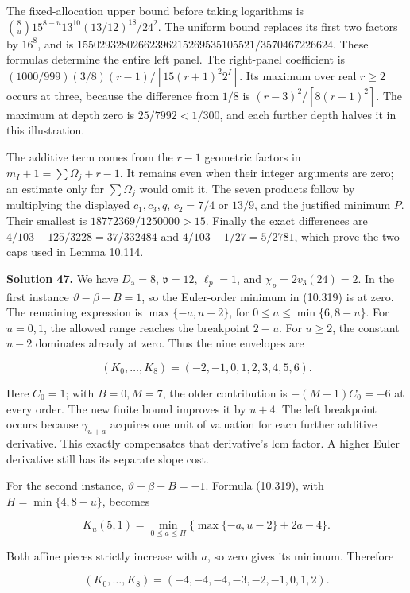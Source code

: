 \documentclass[
  11pt,
  a4paper,
]{article}
\begin{document}
The fixed-allocation upper bound before taking logarithms is
\(\binom8u15^{8-u}13^{10}(13/12)^{18}/24^2\). The uniform bound replaces
its first two factors by \(16^8\), and is
\(15502932802662396215269535105521/3570467226624\). These formulas
determine the entire left panel. The right-panel coefficient is
\((1000/999)(3/8)(r-1)/[15(r+1)^2 2^I]\). Its maximum over real
\(r\ge2\) occurs at three, because the difference from \(1/8\) is
\((r-3)^2/[8(r+1)^2]\). The maximum at depth zero is \(25/7992<1/300\),
and each further depth halves it in this illustration.

The additive term comes from the \(r-1\) geometric factors in
\(m_I+1=\sum\Omega_j+r-1\). It remains even when their integer arguments
are zero; an estimate only for \(\sum\Omega_j\) would omit it. The seven
products follow by multiplying the displayed \(c_1,c_3,q\), \(c_2=7/4\)
or \(13/9\), and the justified minimum \(P\). Their smallest is
\(18772369/1250000>15\). Finally the exact differences are
\(4/103-125/3228=37/332484\) and \(4/103-1/27=5/2781\), which prove the
two caps used in Lemma 10.114.

\textbf{Solution 47.} We have \(D_{\mathrm a}=8\), \(\mathfrak v=12\),
\(\ell_p=1\), and \(\chi_p=2v_3(24)=2\). In the first instance
\(\vartheta-\beta+B=1\), so the Euler-order minimum in (10.319) is at
zero. The remaining expression is \(\max\{-a,u-2\}\), for
\(0\le a\le\min\{6,8-u\}\). For \(u=0,1\), the allowed range reaches the
breakpoint \(2-u\). For \(u\ge2\), the constant \(u-2\) dominates
already at zero. Thus the nine envelopes are

\[
(K_0,\ldots,K_8)=(-2,-1,0,1,2,3,4,5,6).
\]

Here \(C_0=1\); with \(B=0,M=7\), the older contribution is
\(-(M-1)C_0=-6\) at every order. The new finite bound improves it by
\(u+4\). The left breakpoint occurs because \(\gamma_{u+a}\) acquires
one unit of valuation for each further additive derivative. This exactly
compensates that derivative's lcm factor. A higher Euler derivative
still has its separate slope cost.

For the second instance, \(\vartheta-\beta+B=-1\). Formula (10.319),
with \(H=\min\{4,8-u\}\), becomes

\[
K_u(5,1)=\min_{0\le a\le H}
\{\max\{-a,u-2\}+2a-4\}.
\]

Both affine pieces strictly increase with \(a\), so zero gives its
minimum. Therefore

\[
(K_0,\ldots,K_8)=(-4,-4,-4,-3,-2,-1,0,1,2).
\]
\end{document}
